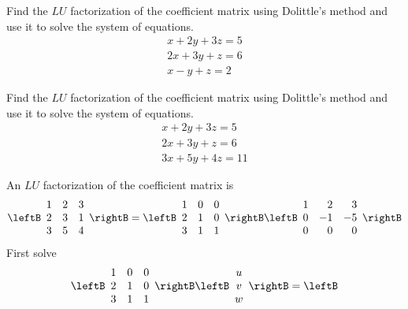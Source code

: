 \begin{enumialphparenastyle}
\begin{ex} Find the $LU$ factorization of the coefficient matrix using Dolittle's
method and use it to solve the system of equations. 
\begin{equation*}
\begin{array}{c}
x+2y+3z=5 \\ 
2x+3y+z=6 \\ 
x-y+z=2
\end{array}
\end{equation*}
\end{ex}

\begin{ex} Find the $LU$ factorization of the coefficient matrix using Dolittle's
method and use it to solve the system of equations. 
\begin{equation*}
\begin{array}{c}
x+2y+3z=5 \\ 
2x+3y+z=6 \\ 
3x+5y+4z=11
\end{array}
\end{equation*}
\begin{sol}
An $LU$ factorization of the coefficient matrix is
\[
\leftB
\begin{array}{rrr}
1 & 2 & 3 \\
2 & 3 & 1 \\
3 & 5 & 4
\end{array}
\rightB = \leftB
\begin{array}{rrr}
1 & 0 & 0 \\
2 & 1 & 0 \\
3 & 1 & 1
\end{array}
\rightB \leftB
\begin{array}{rrr}
1 & 2 & 3 \\
0 & -1 & -5 \\
0 & 0 & 0
\end{array}
\rightB
\]
First solve
\[
 \leftB
\begin{array}{rrr}
1 & 0 & 0 \\
2 & 1 & 0 \\
3 & 1 & 1
\end{array}
\rightB \leftB
\begin{array}{c}
u \\
v \\
w
\end{array}
\rightB =\leftB
\begin{array}{c}

\end{array}\]
\end{sol}
\end{ex}
\end{enumialphparenastyle}
